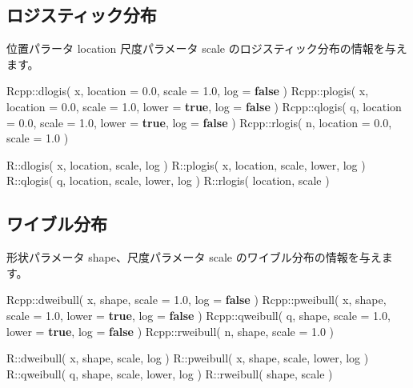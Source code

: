 \documentclass[]{book}
\newenvironment{Shaded}{\begin{snugshade}}{\end{snugshade}}
\newcommand{\FloatTok}[1]{\textcolor[rgb]{0.00,0.00,0.81}{#1}}
\newcommand{\KeywordTok}[1]{\textcolor[rgb]{0.13,0.29,0.53}{\textbf{#1}}}
\newcommand{\NormalTok}[1]{#1}
\begin{document}
\subsection{ロジスティック分布}

位置パラータ location 尺度パラメータ scale のロジスティック分布の情報を与えます。

\begin{Shaded}
\begin{Highlighting}[]
\NormalTok{Rcpp::dlogis( x, location = }\FloatTok{0.0}\NormalTok{, scale = }\FloatTok{1.0}\NormalTok{,               log = }\KeywordTok{false}\NormalTok{ )}
\NormalTok{Rcpp::plogis( x, location = }\FloatTok{0.0}\NormalTok{, scale = }\FloatTok{1.0}\NormalTok{, lower = }\KeywordTok{true}\NormalTok{, log = }\KeywordTok{false}\NormalTok{ )}
\NormalTok{Rcpp::qlogis( q, location = }\FloatTok{0.0}\NormalTok{, scale = }\FloatTok{1.0}\NormalTok{, lower = }\KeywordTok{true}\NormalTok{, log = }\KeywordTok{false}\NormalTok{ )}
\NormalTok{Rcpp::rlogis( n, location = }\FloatTok{0.0}\NormalTok{, scale = }\FloatTok{1.0}\NormalTok{ )}

\NormalTok{R::dlogis( x, location, scale,        log )}
\NormalTok{R::plogis( x, location, scale, lower, log )}
\NormalTok{R::qlogis( q, location, scale, lower, log )}
\NormalTok{R::rlogis(    location, scale )}
\end{Highlighting}
\end{Shaded}

\subsection{ワイブル分布}

形状パラメータ shape、尺度パラメータ scale のワイブル分布の情報を与えます。

\begin{Shaded}
\begin{Highlighting}[]
\NormalTok{Rcpp::dweibull( x, shape, scale = }\FloatTok{1.0}\NormalTok{,               log = }\KeywordTok{false}\NormalTok{  )}
\NormalTok{Rcpp::pweibull( x, shape, scale = }\FloatTok{1.0}\NormalTok{, lower = }\KeywordTok{true}\NormalTok{, log = }\KeywordTok{false}\NormalTok{  )}
\NormalTok{Rcpp::qweibull( q, shape, scale = }\FloatTok{1.0}\NormalTok{, lower = }\KeywordTok{true}\NormalTok{, log = }\KeywordTok{false}\NormalTok{  )}
\NormalTok{Rcpp::rweibull( n, shape, scale = }\FloatTok{1.0}\NormalTok{ )}

\NormalTok{R::dweibull( x, shape, scale,        log )}
\NormalTok{R::pweibull( x, shape, scale, lower, log )}
\NormalTok{R::qweibull( q, shape, scale, lower, log )}
\NormalTok{R::rweibull(    shape, scale )}
\end{Highlighting}
\end{Shaded}
\end{document}
